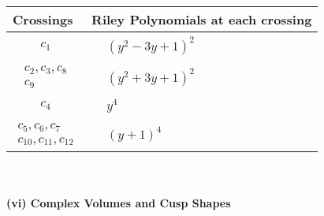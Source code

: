 \documentclass[1p]{elsarticle_modified}
\theoremstyle{definition}
\begin{document}
\begin{tabular}{m{50pt}|m{274pt}}
Crossings & \hspace{64pt}Riley Polynomials at each crossing \\
\hline $$\begin{aligned}c_{1}\end{aligned}$$&$\begin{aligned}
&(y^2-3 y+1)^2
\end{aligned}$\\
\hline $$\begin{aligned}c_{2},c_{3},c_{8}\\c_{9}\end{aligned}$$&$\begin{aligned}
&(y^2+3 y+1)^2
\end{aligned}$\\
\hline $$\begin{aligned}c_{4}\end{aligned}$$&$\begin{aligned}
&y^4
\end{aligned}$\\
\hline $$\begin{aligned}c_{5},c_{6},c_{7}\\c_{10},c_{11},c_{12}\end{aligned}$$&$\begin{aligned}
&(y+1)^4
\end{aligned}$\\
\hline
\end{tabular}\\~\\
\newpage\flushleft \textbf{(vi) Complex Volumes and Cusp Shapes}
\end{document}
